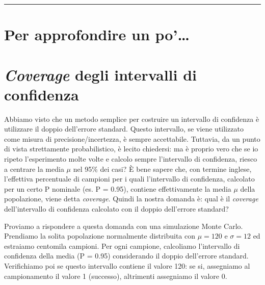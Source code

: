 \documentclass[a4paper,12pt,oneside]{book}
\begin{document}
\begin{center}\rule{0.5\linewidth}{0.5pt}\end{center}

\hypertarget{per-approfondire-un-po}{%
\section{Per approfondire un po'\ldots{}}\label{per-approfondire-un-po}}

\hypertarget{coverage-degli-intervalli-di-confidenza}{%
\section{\texorpdfstring{\emph{Coverage} degli intervalli di confidenza}{Coverage degli intervalli di confidenza}}\label{coverage-degli-intervalli-di-confidenza}}

Abbiamo visto che un metodo semplice per costruire un intervallo di confidenza è utilizzare il doppio dell'errore standard. Questo intervallo, se viene utilizzato come misura di precisione/incertezza, è sempre accettabile. Tuttavia, da un punto di vista strettamente probabilistico, è lecito chiedersi: ma è proprio vero che se io ripeto l'esperimento molte volte e calcolo sempre l'intervallo di confidenza, riesco a centrare la media \(\mu\) nel 95\% dei casi? È bene sapere che, con termine inglese, l'effettiva percentuale di campioni per i quali l'intervallo di confidenza, calcolato per un certo P nominale (es. P = 0.95), contiene effettivamente la media \(\mu\) della popolazione, viene detta \emph{coverage}. Quindi la nostra domanda è: qual è il \emph{coverage} dell'intervallo di confidenza calcolato con il doppio dell'errore standard?

Proviamo a rispondere a questa domanda con una simulazione Monte Carlo. Prendiamo la solita popolazione normalmente distribuita con \(\mu = 120\) e \(\sigma = 12\) ed estraiamo centomila campioni. Per ogni campione, calcoliamo l'intervallo di confidenza della media (P = 0.95) considerando il doppio dell'errore standard. Verifichiamo poi se questo intervallo contiene il valore 120: se si, assegniamo al campionamento il valore 1 (successo), altrimenti assegniamo il valore 0.
\end{document}
